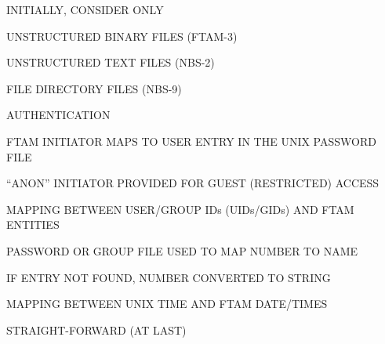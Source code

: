 \begin{bwslide}

\begin{nrtc}
\item	INITIALLY, CONSIDER ONLY
    \begin{nrtc}
    \item	UNSTRUCTURED BINARY FILES (FTAM-3)

    \item	UNSTRUCTURED TEXT FILES (NBS-2)

    \item	FILE DIRECTORY FILES (NBS-9)
    \end{nrtc}

\item	AUTHENTICATION
    \begin{nrtc}
    \item	FTAM INITIATOR MAPS TO USER ENTRY IN THE UNIX PASSWORD FILE

    \item	``ANON'' INITIATOR PROVIDED FOR GUEST (RESTRICTED) ACCESS
    \end{nrtc}

\item	MAPPING BETWEEN USER/GROUP IDs (UIDs/GIDs) AND FTAM ENTITIES
    \begin{nrtc}
    \item	PASSWORD OR GROUP FILE USED TO MAP NUMBER TO NAME

    \item	IF ENTRY NOT FOUND, NUMBER CONVERTED TO STRING
    \end{nrtc}

\item	MAPPING BETWEEN UNIX TIME AND FTAM DATE/TIMES
    \begin{nrtc}
    \item	STRAIGHT-FORWARD (AT LAST)
    \end{nrtc}
\end{nrtc}
\end{bwslide}


